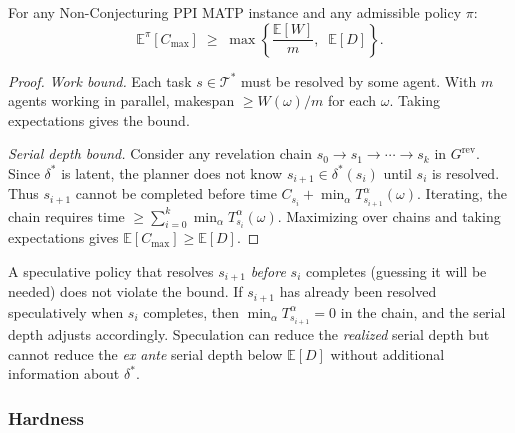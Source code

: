 \begin{theorem}\label{thm:lower-bounds}
For any Non-Conjecturing PPI MATP instance and any admissible policy $\pi$:
\[
\mathbb{E}^\pi[C_{\max}] \;\ge\; \max\!\left\{\frac{\mathbb{E}[W]}{m},\;\; \mathbb{E}[D]\right\}.
\]
\end{theorem}

\begin{proof}
\emph{Work bound.} Each task $s\in\mathcal{T}^*$ must be resolved by some agent. With $m$ agents working in parallel, makespan $\ge W(\omega)/m$ for each $\omega$. Taking expectations gives the bound.

\emph{Serial depth bound.} Consider any revelation chain $s_0\to s_1\to\cdots\to s_k$ in $G^{\mathrm{rev}}$. Since $\delta^*$ is latent, the planner does not know $s_{i+1}\in\delta^*(s_i)$ until $s_i$ is resolved. Thus $s_{i+1}$ cannot be completed before time $C_{s_i} + \min_\alpha T^\alpha_{s_{i+1}}(\omega)$. Iterating, the chain requires time $\ge \sum_{i=0}^k \min_\alpha T^\alpha_{s_i}(\omega)$. Maximizing over chains and taking expectations gives $\mathbb{E}[C_{\max}] \ge \mathbb{E}[D]$.
\end{proof}

\begin{remark}
A speculative policy that resolves $s_{i+1}$ \emph{before} $s_i$ completes (guessing it will be needed) does not violate the bound. If $s_{i+1}$ has already been resolved speculatively when $s_i$ completes, then $\min_\alpha T^\alpha_{s_{i+1}} = 0$ in the chain, and the serial depth adjusts accordingly. Speculation can reduce the \emph{realized} serial depth but cannot reduce the \emph{ex ante} serial depth below $\mathbb{E}[D]$ without additional information about $\delta^*$.
\end{remark}


\subsubsection{Hardness}\label{sec:hardness}

